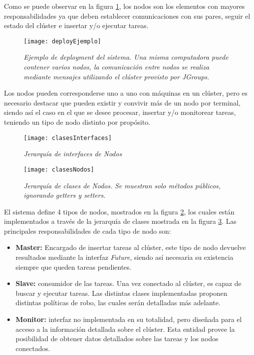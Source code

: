 \documentclass[12pt,a4paper,oneside,spanish]{report}
\begin{document}
Como se puede observar en la figura \ref{fig:deployEjemplo}, los nodos son los elementos con mayores responsabilidades ya que deben establecer comunicaciones con sus pares, seguir el estado del clúster e insertar y/o ejecutar tareas. 

\begin{figure}
\texttt{[image: deployEjemplo]}
\caption{\textit{Ejemplo de deployment del sistema. Una misma computadora puede contener varios nodos, la comunicación entre nodos se realiza mediante mensajes utilizando el clúster provisto por JGroups.}}
\label{fig:deployEjemplo}
\end{figure}

Los nodos pueden corresponderse uno a uno con máquinas en un clúster, pero es necesario destacar que pueden existir y convivir más de un nodo por terminal, siendo así el caso en el que se desee procesar, insertar y/o monitorear tareas, teniendo un tipo de nodo distinto por propósito.

\begin{figure}
\texttt{[image: clasesInterfaces]}
\caption{\textit{Jerarquía de interfaces de Nodos}}
\label{fig:interfacesNodos}
\end{figure}


\begin{figure}
\texttt{[image: clasesNodos]}
\caption{\textit{Jerarquía de clases de Nodos. Se muestran solo métodos públicos, ignorando \textit{getters} y \textit{setters}.}}
\label{fig:clasesNodos}
\end{figure}



El sistema define 4 tipos de nodos, mostrados en la figura \ref{fig:interfacesNodos}, los cuales están implementados a través de la jerarquía de clases mostrada en la figura \ref{fig:clasesNodos}. Las principales responsabilidades de cada tipo de nodo son:

\begin{itemize}
	\item \textbf{Master:} Encargado de insertar tareas al clúster, este tipo de nodo devuelve resultados mediante la interfaz \textit{Future}, siendo así necesaria su existencia siempre que queden tareas pendientes.
	\item \textbf{Slave:} consumidor de las tareas. Una vez conectado al clúster, es capaz de buscar y ejecutar tareas. Las distintas clases implementadas proponen distintas políticas de robo, las cuales serán detalladas más adelante.
	\item \textbf{Monitor:} interfaz no implementada en su totalidad, pero diseñada para el acceso a la información detallada sobre el clúster. Esta entidad provee la posibilidad de obtener datos detallados sobre las tareas y los nodos conectados.
\end{itemize}
\end{document}
